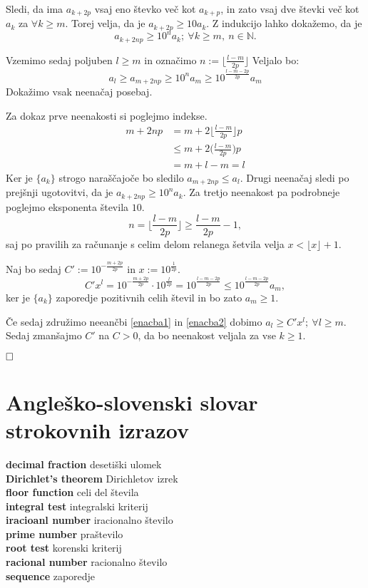 \documentclass[a4paper,12pt]{article}
\def\N{\mathbb{N}} %
\newcommand{\geslo}[2]{\noindent\textbf{#1} \quad \hangindent=1cm #2\\[-1pc]}
\def\qed{$\hfill\Box$}   %
\begin{document}
Sledi, da ima $a_{k+ 2p}$ vsaj eno števko več kot $a_{k+p}$, in zato vsaj dve števki več kot $a_k$
za $\forall k \geq m$.
Torej velja, da je $a_{k+2p} \geq 10 a_k$. Z indukcijo lahko dokažemo, da je 
\[ a_{k+2np} \geq 10^n a_k; \ \forall k \geq m, \ n \in \N.\]

Vzemimo sedaj poljuben $l \geq m$ in označimo $n := \lfloor \frac{l-m}{2p} \rfloor$
Veljalo bo:
\begin{equation}\label{enacba1}
    a_l \geq a_{m+2np} \geq 10^n a_m \geq 10 ^{\frac{l-m-2p}{2p}}a_m
\end{equation}
Dokažimo vsak neenačaj posebaj.

Za dokaz prve neenakosti si poglejmo indekse. 
\[
    \begin{split}
    m + 2np &= m + 2 \bigg\lfloor \frac{l-m}{2p}\bigg\rfloor p \\
    &\leq m + 2\bigg(\frac{l-m}{2p}\bigg)p \\
    &= m + l - m = l
    \end{split}
    \] 
Ker je $\{a_k\}$ strogo naraščajoče bo sledilo $a_{m+2np} \leq a_l$.
Drugi neenačaj sledi po prejšnji ugotovitvi, da je $a_{k+2np} \geq 10^n a_k$.
Za tretjo neenakost pa podrobneje poglejmo eksponenta števila $10$. 
\[
    n = \bigg\lfloor \frac{l-m}{2p}\bigg\rfloor \geq \frac{l-m}{2p} - 1,
     \]
saj po pravilih za računanje s celim delom relanega šetvila velja $x < \lfloor x\rfloor + 1$.

Naj bo sedaj $C' := 10^{-\frac{m + 2p}{2p}}$ in $x := 10^{\frac{1}{2p}}$.
\begin{equation}\label{enacba2}
     C'x^l = 10^{-\frac{m + 2p}{2p}} \cdot 10^{\frac{l}{2p}} = 10 ^{\frac{l-m-2p}{2p}}
     \leq 10 ^{\frac{l-m-2p}{2p}} a_m,
\end{equation}
ker je $\{a_k\}$ zaporedje pozitivnih celih števil in bo zato $a_m \geq 1$.

Če sedaj združimo neeančbi \ref{enacba1} in \ref{enacba2} dobimo 
$a_l \geq C'x^l; \ \forall l \geq m$. Sedaj zmanšajmo $C'$ na $C>0$, da bo neenakost veljala
za vse $k \geq 1$.

\qed

\section*{Angleško-slovenski slovar strokovnih izrazov}

\geslo{decimal fraction}{desetiški ulomek}

\geslo{Dirichlet's theorem}{Dirichletov izrek}

\geslo{floor function}{celi del števila}

\geslo{integral test}{integralski kriterij}

\geslo{iracioanl number}{iracionalno število}

\geslo{prime number}{praštevilo}

\geslo{root test}{korenski kriterij}

\geslo{racional number}{racionalno število}

\geslo{sequence}{zaporedje}
\end{document}
